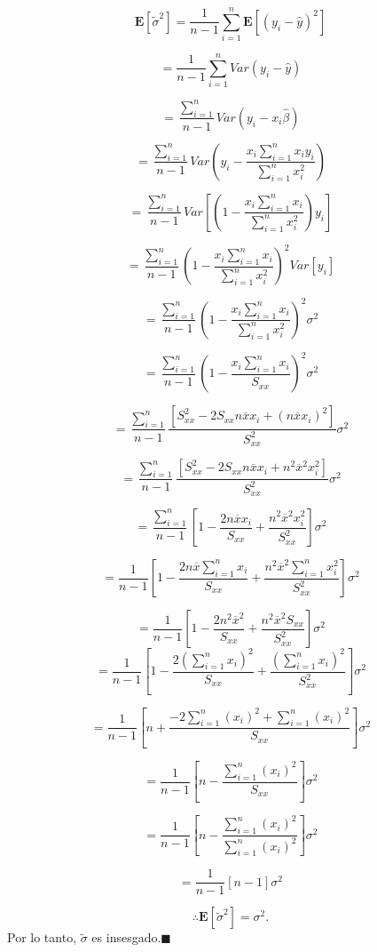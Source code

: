 \documentclass[
  a4paper,
  oneside,
  openany]{book}
\begin{document}
\[\mathbf{E}[\tilde{\sigma}^2]=\frac{1}{n-1}\sum_{i=1}^{n}\mathbf{E}\left[(y_{i}-\hat{y})^2\right]\]

\[=\frac{1}{n-1}\sum_{i=1}^{n}Var(y_{i}-\hat{y})\]

\[=\frac{\sum_{i=1}^{n}}{n-1}Var(y_{i}-x_{i}\hat{\beta})\]

\[=\frac{\sum_{i=1}^{n}}{n-1}Var\left(y_{i}-\frac{x_{i}\sum_{i=1}^{n}x_{i}y_{i}}{\sum_{i=1}^{n}x_{i}^2}\right)\]

\[=\frac{\sum_{i=1}^{n}}{n-1}Var\left[\left(1-\frac{x_{i}\sum_{i=1}^{n}x_{i}}{\sum_{i=1}^{n}x_{i}^2}\right)y_{i}\right]\]

\[=\frac{\sum_{i=1}^{n}}{n-1}\left(1-\frac{x_{i}\sum_{i=1}^{n}x_{i}}{\sum_{i=1}^{n}x_{i}^2}\right)^2Var[y_{i}]\]

\[=\frac{\sum_{i=1}^{n}}{n-1}\left(1-\frac{x_{i}\sum_{i=1}^{n}x_{i}}{\sum_{i=1}^{n}x_{i}^2}\right)^2\sigma^2\]

\[=\frac{\sum_{i=1}^{n}}{n-1}\left(1-\frac{x_{i}\sum_{i=1}^{n}x_{i}}{S_{xx}}\right)^2\sigma^2\]

\[=\frac{\sum_{i=1}^{n}}{n-1}\frac{[S_{xx}^2-2S_{xx}n\overline{x}x_{i}+(n\overline{x}x_{i})^2]}{S_{xx}^2}\sigma^2\]

\[=\frac{\sum_{i=1}^{n}}{n-1}\frac{[S_{xx}^2-2S_{xx}n\overline{x}x_{i}+n^2\overline{x}^2x_{i}^2]}{S_{xx}^2}\sigma^2\]

\[=\frac{\sum_{i=1}^{n}}{n-1}\left[ 1-\frac{2n\overline{x}x_{i}}{S_{xx}}+\frac{n^2\overline{x}^2x_{i}^2}{S_{xx}^2}\right]\sigma^2\]

\[=\frac{1}{n-1}\left[ 1-\frac{2n\overline{x}\sum_{i=1}^{n}x_{i}}{S_{xx}}+\frac{n^2\overline{x}^2\sum_{i=1}^{n}x_{i}^2}{S_{xx}^2}\right]\sigma^2\]

\[=\frac{1}{n-1}\left[ 1-\frac{2n^2\overline{x}^2}{S_{xx}}+\frac{n^2\overline{x}^2S_{xx}}{S_{xx}^2}\right]\sigma^2\]
\[=\frac{1}{n-1}\left[ 1-\frac{2(\sum_{i=1 }^{n}x_{i})^2}{S_{xx}}+\frac{(\sum_{i=1}^{n}x_{i})^2}{S_{xx}^2}\right]\sigma^2\]

\[=\frac{1}{n-1}\left[ n+\frac{-2\sum_{i=1 }^{n}(x_{i})^2+\sum_{i=1}^{n}(x_{i})^2}{S_{xx}}\right]\sigma^2\]

\[=\frac{1}{n-1}\left[ n-\frac{\sum_{i=1 }^{n}(x_{i})^2}{S_{xx}}\right]\sigma^2\]

\[=\frac{1}{n-1}\left[ n-\frac{\sum_{i=1 }^{n}(x_{i})^2}{\sum_{i=1 }^{n}(x_{i})^2}\right]\sigma^2\]

\[=\frac{1}{n-1}\left[ n-1\right]\sigma^2\]

\[ \therefore \mathbf{E}[\tilde{\sigma}^2]=\sigma^2.\]
Por lo tanto, \(\tilde{\sigma}\) es insesgado.\(\blacksquare\)
\end{document}
